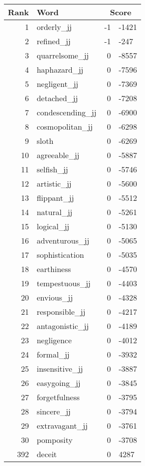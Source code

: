 \begin{longtable}[!htbp]{| rlr@{.}l |}
    \hline
    \textbf{Rank} & \textbf{Word} & \multicolumn{2}{c|}{\textbf{Score}} \\
    \hline
    \endhead
    1 & orderly\_jj & -1 & -1421 \\
    2 & refined\_jj & -1 & -247 \\
    3 & quarrelsome\_jj & 0 & -8557 \\
    4 & haphazard\_jj & 0 & -7596 \\
    5 & negligent\_jj & 0 & -7369 \\
    6 & detached\_jj & 0 & -7208 \\
    7 & condescending\_jj & 0 & -6900 \\
    8 & cosmopolitan\_jj & 0 & -6298 \\
    9 & sloth & 0 & -6269 \\
    10 & agreeable\_jj & 0 & -5887 \\
    11 & selfish\_jj & 0 & -5746 \\
    12 & artistic\_jj & 0 & -5600 \\
    13 & flippant\_jj & 0 & -5512 \\
    14 & natural\_jj & 0 & -5261 \\
    15 & logical\_jj & 0 & -5130 \\
    16 & adventurous\_jj & 0 & -5065 \\
    17 & sophistication & 0 & -5035 \\
    18 & earthiness & 0 & -4570 \\
    19 & tempestuous\_jj & 0 & -4403 \\
    20 & envious\_jj & 0 & -4328 \\
    21 & responsible\_jj & 0 & -4217 \\
    22 & antagonistic\_jj & 0 & -4189 \\
    23 & negligence & 0 & -4012 \\
    24 & formal\_jj & 0 & -3932 \\
    25 & insensitive\_jj & 0 & -3887 \\
    26 & easygoing\_jj & 0 & -3845 \\
    27 & forgetfulness & 0 & -3795 \\
    28 & sincere\_jj & 0 & -3794 \\
    29 & extravagant\_jj & 0 & -3761 \\
    30 & pomposity & 0 & -3708 \\
    392 & deceit & 0 & 4287 \\

\end{longtable}
